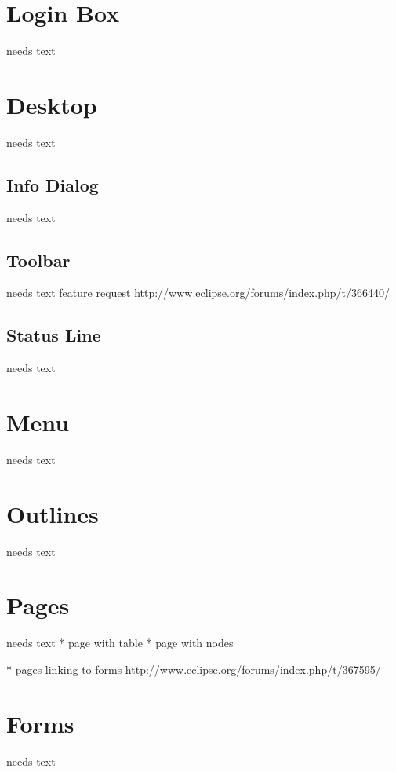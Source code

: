 \documentclass[a4paper,10pt,twoside]{book}
\begin{document}
\section{Login Box}
needs text


\section{Desktop}
needs text

\subsection{Info Dialog}
needs text

\subsection{Toolbar}
needs text
feature request \url{http://www.eclipse.org/forums/index.php/t/366440/}

\subsection{Status Line}
needs text

\section{Menu}
needs text

\section{Outlines}
needs text

\section{Pages}
needs text
    * page with table
	* page with nodes
	
	* pages linking to forms \url{http://www.eclipse.org/forums/index.php/t/367595/}

\section{Forms}
needs text
\end{document}
